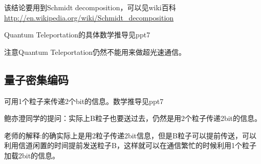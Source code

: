 \documentclass[10pt,a4paper,nocap]{ctexart}
\begin{document}
该结论要用到Schmidt decomposition，可以见wiki百科\url{http://en.wikipedia.org/wiki/Schmidt_decomposition}

Quantum Teleportation的具体数学推导见ppt7

注意Quantum Teleportation仍然不能用来做超光速通信。
\subsection{量子密集编码}
可用1个粒子来传递2个bit的信息。数学推导见ppt7

鲍亦澄同学的提问：实际上B粒子也要送过去，仍然是用2个粒子传递2bit的信息。

老师的解释:的确实际上是用2粒子传递2bit信息，但是B粒子可以提前传送，可以利用信道闲置的时间提前发送粒子B，这样就可以在通信繁忙的时候利用1个粒子加载2bit的信息。
\end{document}
